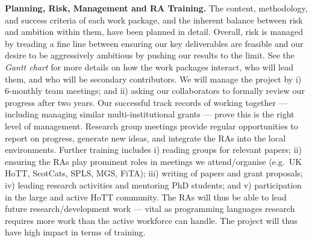 \documentclass[a4paper,11pt]{article}
\newcommand{\eg}{{e.g.}\ }
\begin{document}
{\bf Planning, Risk, Management and RA Training.}  The content,
methodology, and success criteria of each work package, and the
inherent balance between risk and ambition within them, have been
planned in detail.  Overall, risk is managed by treading a fine line
between ensuring our key deliverables are feasible and our desire to
be aggressively ambitious by pushing our results to the limit. See the
{\em Gantt chart} for more details on how the work packages interact,
who will lead them, and who will be secondary contributors.
We will manage the project by i)
6-monthly team meetings; and ii) asking our collaborators to formally
review our progress after two years.  Our successful
track records of working together --- including managing similar
multi-institutional grants --- prove this is the right level of
management. Research group meetings provide regular opportunities to
report on progress, generate new ideas, and integrate the RAs into the
local environments. Further training includes i) reading groups for
relevant papers; ii) ensuring the RAs play prominent roles in meetings
we attend/organise (\eg UK HoTT, ScotCats, SPLS, MGS, FiTA); iii)
writing of papers and grant proposals; iv) leading research activities
and mentoring PhD students; and v) participation in the large and
active HoTT community. The RAs will thus be able to lead future
research/development work --- vital as programming languages research
requires more work than the active workforce can handle. The
project will thus have high impact in terms of training.







\begin{footnotesize}
\begin{multicols}{2}

%
%

\end{multicols}
\end{footnotesize}

% 
% 
\end{document}
